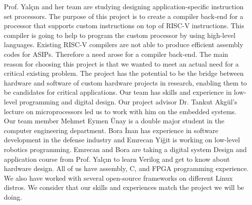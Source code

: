 Prof. Yalçın and her team are studying designing application-specific instruction set processors. The purpose of this project is to create a compiler back-end for a processor that supports custom instructions on top of RISC-V instructions. This compiler is going to help to program the custom processor by using high-level languages. Existing RISC-V compilers are not able to produce efficient assembly codes for ASIPs. Therefore a need arose for a compiler back-end.
The main reason for choosing this project is that we wanted to meet an actual need for a critical existing problem. The project has the potential to be the bridge between hardware and software of custom hardware projects in research, enabling them to be candidates for critical applications. Our team has skills and experience in low-level programming and digital design. Our project advisor Dr. Tankut Akgül’s lecture on microprocessors led us to work with him on the embedded systems. Our team member Mehmet Eymen Ünay is a double major student in the computer engineering department. Bora İnan has experience in software development in the defense industry and Emrecan Yiğit is working on low-level robotics programming. Emrecan and Bora are taking a digital system Design and application course from Prof. Yalçın to learn Verilog and get to know about hardware design. All of us have assembly, C, and FPGA programming experience. We also have worked with several open-source frameworks on different Linux distros. We consider that our skills and experiences match the project we will be doing.

